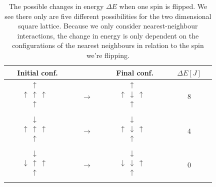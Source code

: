 \documentclass[%
 reprint,
nofootinbib,
aps,
]{revtex4-1}
\begin{document}
\begin{table}[]
\caption{The possible changes in energy $\Delta E$ when one spin is flipped. We see there only are five different possibilities for the two dimensional square lattice. Because we only consider nearest-neighbour interactions, the change in energy is only dependent on the configurations of the nearest neighbours in relation to the spin we're flipping.}
\label{table:DeltaE}
\begin{tabular}{@{}ccc|c@{}}
\toprule
$\quad$ Initial conf. $\quad$ &  & $\quad$ Final conf. $\quad$ & $\quad \Delta E [J] \quad$ \\ \midrule
$\begin{matrix}& \uparrow & \\ \uparrow & \uparrow & \uparrow \\ & \uparrow & \\ & & & \end{matrix}$ & $\quad \boldsymbol{\rightarrow} \quad$ & $\begin{matrix}& \uparrow & \\ \uparrow & \downarrow & \uparrow \\ & \uparrow & \\ & & & \end{matrix}$ & $8$ \\
$\begin{matrix}& \downarrow & \\ \uparrow & \uparrow & \uparrow \\ & \uparrow & \\ & & & \end{matrix}$ & $\boldsymbol{\rightarrow}$ & $\begin{matrix}& \downarrow & \\ \uparrow & \downarrow & \uparrow \\ & \uparrow & \\ & & & \end{matrix}$ & $4$ \\
$\begin{matrix}& \downarrow & \\ \downarrow & \uparrow & \uparrow \\ & \uparrow & \\ & & & \end{matrix}$ & $\boldsymbol{\rightarrow}$ & $\begin{matrix}& \downarrow & \\ \downarrow & \downarrow & \uparrow \\ & \uparrow & \\ & & & \end{matrix}$ & $0$ \\

\end{tabular}
\end{table}
\end{document}

